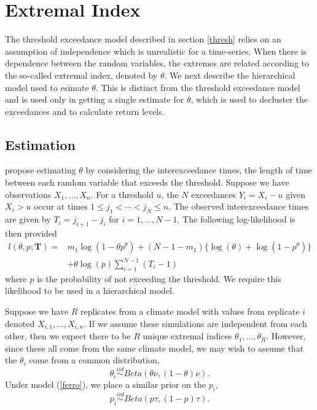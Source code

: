 \documentclass[12pt]{article}
\newcommand{\m}[1]{\mathbf{\bm{#1}}}
\begin{document}
\section{Extremal Index}
\label{index}

The threshold exceedance model described in section \ref{thresh} relies on an assumption of independence which is unrealistic for a time-series. When there is dependence between the random variables, the extremes are related according to the so-called extremal index, denoted by $\theta$. We next describe the hierarchical model used to esimate $\theta$. This is distinct from the threshold exceedance model and is used only in getting a single estimate for $\theta$, which is used to decluster the exceedances and to calculate return levels.

\subsection{Estimation}

\cite{ferro2003inference} propose estimating $\theta$ by considering the interexceedance times, the length of time between each random variable that exceeds the threshold. Suppose we have observations $X_1,\ldots,X_n$. For a threshold $u$, the $N$ exceedances $Y_i=X_i-u$ given $X_i>u$ occur at times $1\leq j_1<\cdots< j_N\leq n$. The observed interexceedance times are given by $T_i=j_{i+1}-j_i$ for $i=1,\ldots,N-1$. The following log-likelihood is then provided
\begin{align}
l(\theta, p; \m{T}) =& m_1\log(1-\theta p^\theta) + (N-1-m_1)\{\log(\theta)+ \log(1-p^\theta)\} \nonumber \\
 &+ \theta\log(p)\sum_{i=1}^{N-1}(T_i-1) \label{ferro}
\end{align}
where $p$ is the probability of not exceeding the threshold. We require this likelihood to be used in a hierarchical model.

Suppose we have $R$ replicates from a climate model with values from replicate $i$ denoted $X_{i,1},\ldots,X_{i,n}$. If we assume these simulations are independent from each other, then we expect there to be $R$ unique extremal indices $\theta_1,\ldots,\theta_R$. However, since these all come from the same climate model, we may wish to assume that the $\theta_i$ come from a common distribution,
\[ \theta_i \overset{iid}\sim Beta\left(\theta\nu, (1-\theta)\nu\right). \]
Under model (\ref{ferro}), we place a similar prior on the $p_i$,
\[ p_i \overset{iid}\sim Beta\left(p\tau, (1-p)\tau\right). \]
\end{document}
